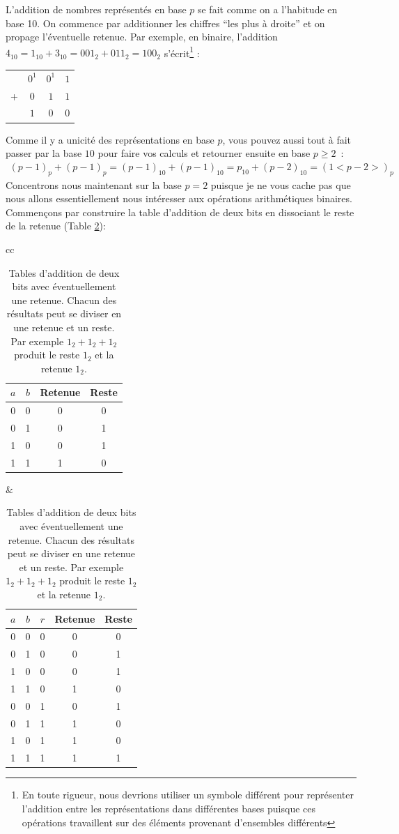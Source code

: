 L'addition de nombres représentés en base $p$ se fait comme on a l'habitude en base 10. On commence par additionner les chiffres ``les plus à droite'' et on propage l'éventuelle retenue. Par exemple, en binaire, l'addition $4_{10} = 1_{10} + 3_{10} = 001_2 + 011_2 = 100_2$ s'écrit\footnote{En toute rigueur, nous devrions utiliser un symbole différent pour représenter l'addition entre les représentations dans différentes bases puisque ces opérations travaillent sur des éléments provenant d'ensembles différents} :\\
\begin{center}
\begin{tabular}{cccc}
& $0^1$ & $0^1$ & $1$ \\
+&$0$ & $1$ & $1$\\
\hline
 &$1$ &$0$ &$0$ 
\end{tabular}
\end{center}
Comme il y a unicité des représentations en base $p$, vous pouvez aussi tout à fait passer par la base $10$ pour faire vos calculs et retourner ensuite en base $p \geq 2$~:
\begin{eqnarray*}
(p-1)_p + (p-1)_p = (p-1)_{10} + (p-1)_{10} = p_{10} + (p-2)_{10} = (1<p-2>)_p
\end{eqnarray*}
Concentrons nous maintenant sur la base $p=2$ puisque je ne vous cache pas que nous allons essentiellement nous intéresser aux opérations arithmétiques binaires. Commençons par construire la table d'addition de deux bits en dissociant le reste de la retenue (Table \ref{table:addition_2bits}):
\begin{table}[h!]
\centering\begin{tabular}{cc}
\begin{tabular}{cc|cc}
$a$ & $b$ & Retenue & Reste\\
\hline
0 & 0 & 0 & 0\\
0 & 1 & 0 & 1\\
1 & 0 & 0 & 1\\
1 & 1 & 1 & 0
\end{tabular}&
\begin{tabular}{ccc|cc}
$a$ & $b$ & $r$& Retenue & Reste\\
\hline
0 & 0 & 0 & 0 & 0\\
0 & 1 & 0 & 0 & 1\\
1 & 0 & 0 & 0 & 1\\
1 & 1 & 0 & 1 & 0\\
0 & 0 & 1 & 0 & 1\\
0 & 1 & 1 & 1 & 0\\
1 & 0 & 1 & 1 & 0\\
1 & 1 & 1 & 1 & 1
\end{tabular}
\end{tabular}
\caption{\label{table:addition_2bits} Tables d'addition de deux bits avec éventuellement une retenue. Chacun des résultats peut se diviser en une retenue et un reste. Par exemple $1_2 + 1_2 + 1_2$ produit le reste $1_2$ et la retenue $1_2$.}
\end{table}

